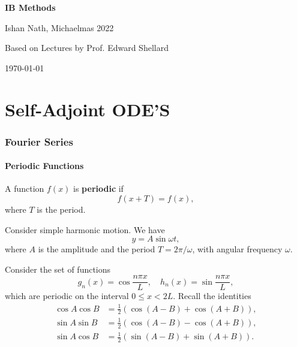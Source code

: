 \documentclass[12pt]{article}
\begin{document}
\hypersetup{pageanchor=false}
\begin{titlepage}
	\begin{center}
		\vspace*{1em}
		\Huge
		\textbf{IB Methods}

		\vspace{1em}
		\large
		Ishan Nath, Michaelmas 2022

		\vspace{1.5em}

		\Large

		Based on Lectures by Prof. Edward Shellard

		\vspace{1em}

		\large
		\today
	\end{center}
	
\end{titlepage}
\hypersetup{pageanchor=true}

\tableofcontents

\newpage

\part{Self-Adjoint ODE'S}%
\label{prt:self_adjoint_ode_s}

\section{Fourier Series}%
\label{sec:fourier_series}

\subsection{Periodic Functions}%
\label{sub:periodic_functions}

A function $f(x)$ is \textbf{periodic} if
\[
	f(x + T) = f(x)
,\]
where $T$ is the period.

\begin{exbox}
	Consider simple harmonic motion. We have
	\[
	y = A \sin \omega t
	,\]
	where $A$ is the amplitude and the period $T = 2 \pi / \omega$, with angular frequency $\omega$.
\end{exbox}

Consider the set of functions
\[
	g_n(x) = \cos \frac{n \pi x}{L}, \quad h_n(x) = \sin \frac{n \pi x}{L}
,\]
which are periodic on the interval $0 \leq x < 2L$. Recall the identities
\begin{align*}
	\cos A \cos B &= \frac{1}{2} \left(\cos(A - B) + \cos (A + B) \right), \\
	\sin A \sin B &= \frac{1}{2} \left( \cos(A - B) - \cos(A + B) \right), \\
	\sin A \cos B &=  \frac{1}{2} \left( \sin(A - B) + \sin(A + B) \right).
\end{align*}
\end{document}
